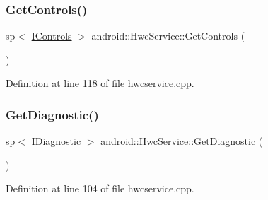 \subsubsection{\texorpdfstring{Get\+Controls()}{GetControls()}}
{\footnotesize\ttfamily sp$<$ \mbox{\hyperlink{classhwcomposer_1_1IControls}{I\+Controls}} $>$ android\+::\+Hwc\+Service\+::\+Get\+Controls (\begin{DoxyParamCaption}{ }\end{DoxyParamCaption})}



Definition at line 118 of file hwcservice.\+cpp.


\begin{DoxyCode}{0}
\end{DoxyCode}
\mbox{\label{classandroid_1_1HwcService_ad8be9ec253b8072a1055700d88e5d8c1}} 
\subsubsection{\texorpdfstring{Get\+Diagnostic()}{GetDiagnostic()}}
{\footnotesize\ttfamily sp$<$ \mbox{\hyperlink{classhwcomposer_1_1IDiagnostic}{I\+Diagnostic}} $>$ android\+::\+Hwc\+Service\+::\+Get\+Diagnostic (\begin{DoxyParamCaption}{ }\end{DoxyParamCaption})}



Definition at line 104 of file hwcservice.\+cpp.


